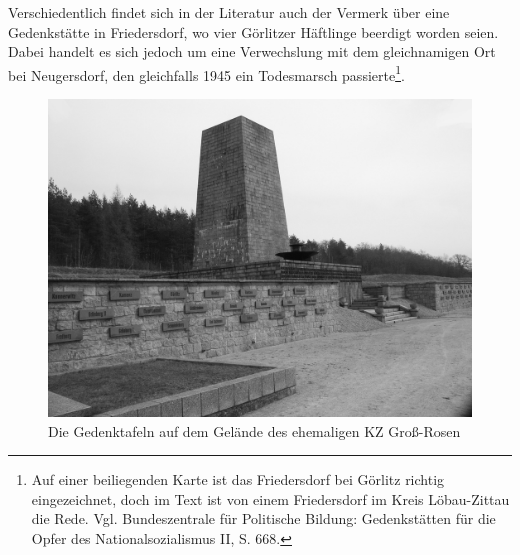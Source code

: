 Verschiedentlich findet sich in der Literatur auch der Vermerk über eine Gedenkstätte in Friedersdorf, wo vier Görlitzer Häftlinge beerdigt worden seien. Dabei handelt es sich jedoch um eine Verwechslung mit dem gleichnamigen Ort bei Neugersdorf, den gleichfalls 1945 ein Todesmarsch passierte\footnote{Auf einer beiliegenden Karte ist das Friedersdorf bei Görlitz richtig eingezeichnet, doch im Text ist von einem Friedersdorf im Kreis Löbau-Zittau die Rede. Vgl. Bundeszentrale für Politische Bildung: Gedenkstätten für die Opfer des Nationalsozialismus II, S. 668.}.

\begin{figure}[htb]
    \includegraphics[width=\linewidth]{images/grossrosen}
    \caption{Die Gedenktafeln auf dem Gelände des ehemaligen KZ Groß-Rosen}
    \label{tafelgr}
\end{figure}

